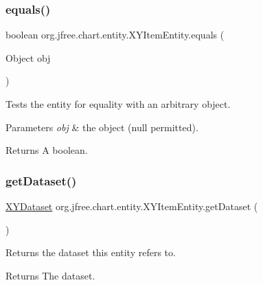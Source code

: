 \subsubsection{\texorpdfstring{equals()}{equals()}}
{\footnotesize\ttfamily boolean org.\+jfree.\+chart.\+entity.\+X\+Y\+Item\+Entity.\+equals (\begin{DoxyParamCaption}\item[{Object}]{obj }\end{DoxyParamCaption})}

Tests the entity for equality with an arbitrary object.


\begin{DoxyParams}{Parameters}
{\em obj} & the object ({\ttfamily null} permitted).\\
\hline
\end{DoxyParams}
\begin{DoxyReturn}{Returns}
A boolean. 
\end{DoxyReturn}
\mbox{\label{classorg_1_1jfree_1_1chart_1_1entity_1_1_x_y_item_entity_a529e20b9fca4d7cf7f7ebf1794a4337f}} 
\subsubsection{\texorpdfstring{get\+Dataset()}{getDataset()}}
{\footnotesize\ttfamily \mbox{\hyperlink{interfaceorg_1_1jfree_1_1data_1_1xy_1_1_x_y_dataset}{X\+Y\+Dataset}} org.\+jfree.\+chart.\+entity.\+X\+Y\+Item\+Entity.\+get\+Dataset (\begin{DoxyParamCaption}{ }\end{DoxyParamCaption})}

Returns the dataset this entity refers to.

\begin{DoxyReturn}{Returns}
The dataset. 
\end{DoxyReturn}
\mbox{\label{classorg_1_1jfree_1_1chart_1_1entity_1_1_x_y_item_entity_a596da177bae684d73fe499fee8ce34fa}} 
